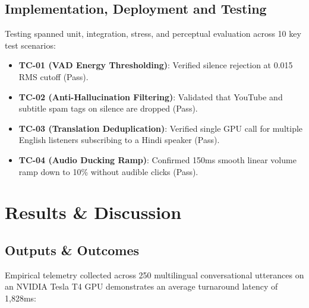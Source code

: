 \documentclass[12pt,a4paper]{report}
\begin{document}
\section{Implementation, Deployment and Testing}
Testing spanned unit, integration, stress, and perceptual evaluation across 10 key test scenarios:
\begin{itemize}
    \item \textbf{TC-01 (VAD Energy Thresholding)}: Verified silence rejection at 0.015 RMS cutoff (Pass).
    \item \textbf{TC-02 (Anti-Hallucination Filtering)}: Validated that YouTube and subtitle spam tags on silence are dropped (Pass).
    \item \textbf{TC-03 (Translation Deduplication)}: Verified single GPU call for multiple English listeners subscribing to a Hindi speaker (Pass).
    \item \textbf{TC-04 (Audio Ducking Ramp)}: Confirmed 150ms smooth linear volume ramp down to 10\% without audible clicks (Pass).
\end{itemize}

\chapter{Results \& Discussion}

\section{Outputs \& Outcomes}
Empirical telemetry collected across 250 multilingual conversational utterances on an NVIDIA Tesla T4 GPU demonstrates an average turnaround latency of 1,828ms:
\end{document}
